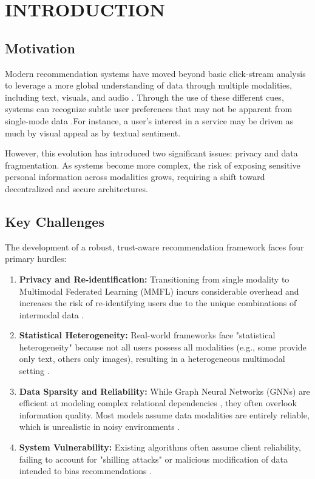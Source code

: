 \documentclass[12pt,a4paper]{report}
\begin{document}
{%
\newpage
{} %

\chapter{INTRODUCTION}
\setcounter{page}{1}
\section{Motivation}
Modern recommendation systems have moved beyond basic click-stream analysis to leverage a more global understanding of data through multiple modalities, including text, visuals, and audio \cite{b1}. Through the use of these different cues, systems can recognize subtle user preferences that may not be apparent from single-mode data \cite{b4}.For instance, a user's interest in a service may be driven as much by visual appeal as by textual sentiment.

However, this evolution has introduced two significant issues: privacy and data fragmentation. As systems become more complex, the risk of exposing sensitive personal information across modalities grows, requiring a shift toward decentralized and secure architectures.

\section{Key Challenges}
The development of a robust, trust-aware recommendation framework faces four primary hurdles:

\begin{enumerate}
    \item \textbf{Privacy and Re-identification:} Transitioning from single modality to Multimodal Federated Learning (MMFL) incurs considerable overhead and increases the risk of re-identifying users due to the unique combinations of intermodal data \cite{b1}.
    \item \textbf{Statistical Heterogeneity:} Real-world frameworks face "statistical heterogeneity" because not all users possess all modalities (e.g., some provide only text, others only images), resulting in a heterogeneous multimodal setting \cite{b5, b6}.
    \item \textbf{Data Sparsity and Reliability:} While Graph Neural Networks (GNNs) are efficient at modeling complex relational dependencies \cite{b2}, they often overlook information quality. Most models assume data modalities are entirely reliable, which is unrealistic in noisy environments \cite{b4}.
    \item \textbf{System Vulnerability:} Existing algorithms often assume client reliability, failing to account for "shilling attacks" or malicious modification of data intended to bias recommendations \cite{b7}.
\end{enumerate}

}
\end{document}
